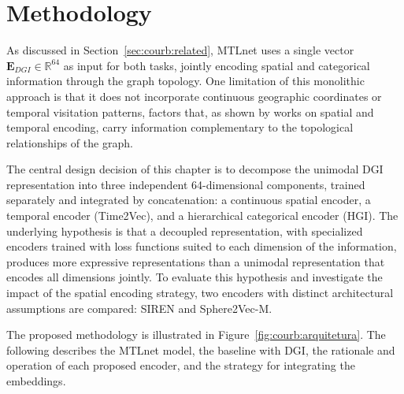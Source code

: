 \section{Methodology}
\label{sec:courb:methods}

As discussed in Section~\ref{sec:courb:related}, MTLnet \cite{silva2025mtlnet} uses a single vector $\mathbf{E}_{DGI} \in \mathbb{R}^{64}$ as input for both tasks, jointly encoding spatial and categorical information through the graph topology. One limitation of this monolithic approach is that it does not incorporate continuous geographic coordinates or temporal visitation patterns, factors that, as shown by works on spatial \cite{wu2024torchspatial} and temporal \cite{kazemi2019time2vec} encoding, carry information complementary to the topological relationships of the graph.

The central design decision of this chapter is to decompose the unimodal DGI representation into three independent 64-dimensional components, trained separately and integrated by concatenation: a continuous spatial encoder, a temporal encoder (Time2Vec), and a hierarchical categorical encoder (HGI). The underlying hypothesis is that a decoupled representation, with specialized encoders trained with loss functions suited to each dimension of the information, produces more expressive representations than a unimodal representation that encodes all dimensions jointly. To evaluate this hypothesis and investigate the impact of the spatial encoding strategy, two encoders with distinct architectural assumptions are compared: SIREN and Sphere2Vec-M.

The proposed methodology is illustrated in Figure~\ref{fig:courb:arquitetura}. The following describes the MTLnet model, the baseline with DGI, the rationale and operation of each proposed encoder, and the strategy for integrating the embeddings.

